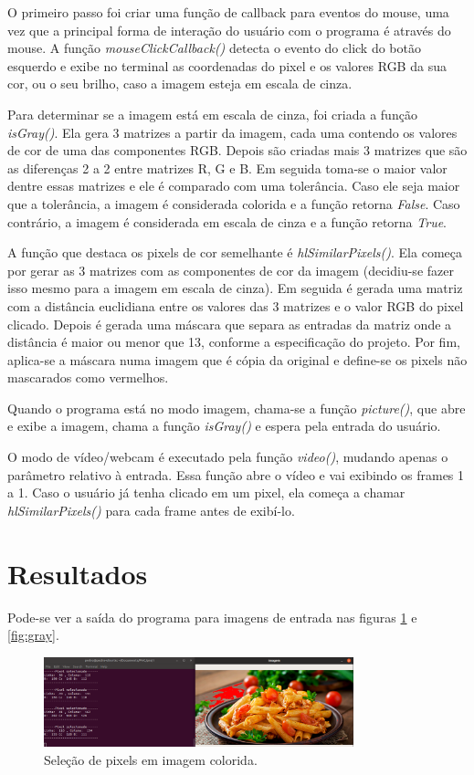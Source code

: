 \documentclass{bmvc2k}
\begin{document}
O primeiro passo foi criar uma função de callback para eventos do mouse, uma vez que a principal forma de interação do usuário com o programa é através do mouse. A função \textit{mouseClickCallback()} detecta o evento do click do botão esquerdo e exibe no terminal as coordenadas do pixel e os valores RGB da sua cor, ou o seu brilho, caso a imagem esteja em escala de cinza.

Para determinar se a imagem está em escala de cinza, foi criada a função \textit{isGray()}. Ela gera 3 matrizes a partir da imagem, cada uma contendo os valores de cor de uma das componentes RGB. Depois são criadas mais 3 matrizes que são as diferenças 2 a 2 entre matrizes R, G e B. Em seguida toma-se o maior valor dentre essas matrizes e ele é comparado com uma tolerância. Caso ele seja maior que a tolerância, a imagem é considerada colorida e a função retorna \textit{False}. Caso contrário, a imagem é considerada em escala de cinza e a função retorna \textit{True}.

A função que destaca os pixels de cor semelhante é \textit{hlSimilarPixels()}. Ela começa por gerar as 3 matrizes com as componentes de cor da imagem (decidiu-se fazer isso mesmo para a imagem em escala de cinza). Em seguida é gerada uma matriz com a distância euclidiana entre os valores das 3 matrizes e o valor RGB do pixel clicado. Depois é gerada uma máscara que separa as entradas da matriz onde a distância é maior ou menor que 13, conforme a especificação do projeto. Por fim, aplica-se a máscara numa imagem que é cópia da original e define-se os pixels não mascarados como vermelhos.

Quando o programa está no modo imagem, chama-se a função \textit{picture()}, que abre e exibe a imagem, chama a função \textit{isGray()} e espera pela entrada do usuário.

O modo de vídeo/webcam é executado pela função \textit{video()}, mudando apenas o parâmetro relativo à entrada. Essa função abre o vídeo e vai exibindo os frames 1 a 1. Caso o usuário já tenha clicado em um pixel, ela começa a chamar \textit{hlSimilarPixels()} para cada frame antes de exibí-lo.

\section{Resultados}
\label{sec:res}

Pode-se ver a saída do programa para imagens de entrada nas figuras \ref{fig:cor} e \ref{fig:gray}.

\begin{figure}[htpb]
\begin{center}
\includegraphics[width=0.8\textwidth]{Figs/img2.png}
\end{center}
   \caption{Seleção de pixels em imagem colorida.}
   \label{fig:cor}
\end{figure}
\end{document}

